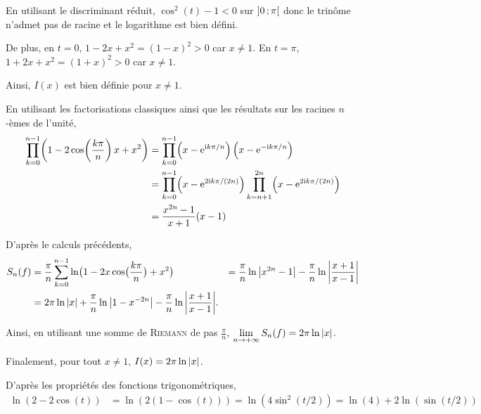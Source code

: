 \begin{solution}
\begin{reponses}
\item En utilisant le discriminant réduit, $\cos^2(t) - 1 < 0$ sur $\left]0\,;\pi\right[$ donc le trinôme n'admet pas de racine et le logarithme est bien défini.

De plus, en $t = 0$, $1 - 2 x + x^2 = (1 - x)^2 > 0$ car $x \neq 1$.
En $t = \pi$, $1 + 2 x + x^2 = (1 + x)^2 > 0$ car $x \neq 1$.

Ainsi, $I(x)$ est bien définie pour $x \neq 1$.

\item En utilisant les factorisations classiques ainsi que les résultats sur les racines $n$-èmes de l'unité,
\begin{align*}
\prod_{k=0}^{n-1} \mathopen{}\left(1 - 2 \cos\mathopen{}\left(\frac{k\pi}{n}\right) x + x^2\right)
&= \prod_{k=0}^{n-1} \mathopen{}\left(x - \mathrm{e}^{\mathrm{i} k\pi/n}\right) \mathopen{}\left(x - \mathrm{e}^{-\mathrm{i} k\pi/n}\right) \\
&= \prod_{k=0}^{n-1} \mathopen{}\left(x - \mathrm{e}^{2\mathrm{i} k\pi/(2n)}\right) \prod_{k=n+1}^{2n} \mathopen{}\left(x - \mathrm{e}^{2\mathrm{i} k\pi/(2n)}\right) \\
&= \frac{x^{2n} - 1}{x + 1} (x - 1)
\end{align*}

\item D'après le calculs précédents,
\begin{align*}
S_n(f)
&= \frac{\pi}{n}\sum\limits_{k=0}^{n-1} \ln\mathopen{}\big(1 - 2 x \cos\mathopen{}\big(\frac{k\pi}{n}\big) + x^2\big)
&= \frac{\pi}{n} \ln\abs{x^{2n}-1} - \frac{\pi}{n} \ln \abs{\frac{x+1}{x-1}} \\
&= 2 \pi \ln\abs{x} + \frac{\pi}{n} \ln \abs{1 - x^{-2n}} - \frac{\pi}{n} \ln \abs{\frac{x+1}{x-1}}.
\end{align*}

Ainsi, en utilisant une somme de \textsc{Riemann} de pas $\frac{\pi}{n}$, $\lim\limits_{n\to +\infty} S_n(f) = 2 \pi \ln\abs{x}$.

Finalement, pour tout $x \neq 1$, $I(x) = 2 \pi \ln\abs{x}$.
\item {}D'après les propriétés des fonctions trigonométriques,
\begin{align*}
\ln(2 - 2 \cos(t))
&= \ln(2(1 - \cos(t)))
= \ln(4 \sin^2(t/2))
= \ln(4) + 2 \ln(\sin(t/2))
\end{align*}


\end{reponses}
\end{solution}
